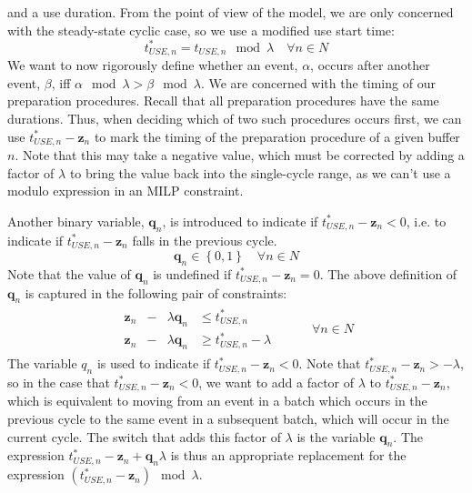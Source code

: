 and a use duration.
From the point of view of the model, we are only concerned with the
steady-state cyclic case, so we use a modified use start time:
\begin{equation}
    t_{\mathit{USE},n}^{*} = t_{\mathit{USE},n} \mod \lambda \quad \forall n
    \in N
\end{equation}
We want to now rigorously define whether an event, $\alpha$, occurs after
another event, $\beta$, iff $ \alpha \mod \lambda > \beta \mod \lambda $.
We are concerned with the timing of our preparation procedures.
Recall that all preparation procedures have the same durations.
Thus, when deciding which of two such procedures occurs first, we can use
$ t_{\mathit{USE},n}^{*} - \boldsymbol{z}_{n} $ to mark the timing of the
preparation procedure of a given buffer $n$.
Note that this may take a negative value, which must be corrected by adding a
factor of $\lambda$ to bring the value back into the single-cycle range, as we
can't use a modulo expression in an MILP constraint.

Another binary variable, $ \boldsymbol{q}_{n} $, is introduced to indicate if
$ t_{\mathit{USE},n}^{*} - \boldsymbol{z}_{n} < 0 $, i.e. to indicate if 
$ t_{\mathit{USE},n}^{*} - \boldsymbol{z}_{n}$ falls in the previous cycle.
\begin{equation}
    \boldsymbol{q}_{n} \in \left\{ 0, 1 \right\} \quad \forall n \in N
    \label{eq.q}
\end{equation}
Note that the value of $ \boldsymbol{q}_{n} $ is undefined if
$ t_{\mathit{USE},n}^{*} - \boldsymbol{z}_{n} = 0 $.
The above definition of $ \boldsymbol{q}_{n} $ is captured in the following
pair of constraints:
\begin{equation}
    \begin{split}
        \begin{alignedat}{2}
            \boldsymbol{z}_{n} & {}-{} & \lambda \boldsymbol{q}_{n} & \le
            t_{\mathit{USE},n}^{*}\\
            \boldsymbol{z}_{n} & {}-{} & \lambda \boldsymbol{q}_{n} & \ge
            t_{\mathit{USE},n}^{*} - \lambda
        \end{alignedat}
    \end{split}
    \quad\quad
    \begin{split}
        \forall n \in N
    \end{split}
    \label{eq.constr8a}
\end{equation}
The variable $q_{n}$ is used to indicate if
$t_{\mathit{USE},n}^{*} - \boldsymbol{z}_{n} < 0$.
Note that $t_{\mathit{USE},n}^{*} - \boldsymbol{z}_{n} > -\lambda$, so in the
case that $t_{\mathit{USE},n}^{*} - \boldsymbol{z}_{n} < 0 $, we want to add a
factor of $\lambda$ to $t_{\mathit{USE},n}^{*} - \boldsymbol{z}_{n}$, which is
equivalent to moving from an event in a batch which occurs in the previous
cycle to the same event in a subsequent batch, which will occur in the current
cycle.
The switch that adds this factor of $\lambda$ is the variable
$\boldsymbol{q}_{n}$.
The expression 
$t_{\mathit{USE},n}^{*} - \boldsymbol{z}_{n} + \boldsymbol{q}_{n} \lambda$
is thus an appropriate replacement for the expression
$\left( t_{\mathit{USE},n}^{*} - \boldsymbol{z}_{n} \right) \mod \lambda$.

